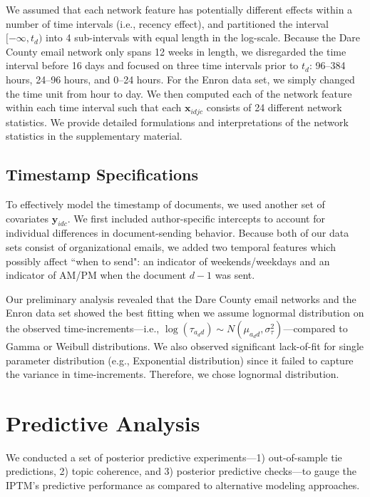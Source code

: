 \documentclass{article}
\begin{document}
We assumed that each network feature has potentially different effects within a number of time intervals (i.e., recency effect), and partitioned the interval $[-\infty, t_d)$ into 4 sub-intervals with equal length in the log-scale. Because the Dare County email network only spans 12 weeks in length, we disregarded the time interval before 16 days and focused on three time intervals prior to $t_d$: 96--384 hours, 24--96 hours, and 0--24 hours. For the Enron data set, we simply changed the time unit from hour to day. We then computed each of the network feature within each time interval such that each $\boldsymbol{x}_{idjc}$ consists of 24 different network statistics. We provide detailed formulations and interpretations of the network statistics in the supplementary material.

\subsection{Timestamp Specifications}\label{subsec:Timestamp Specifications}
To effectively model the timestamp of documents, we used another set of covariates $\boldsymbol{y}_{idc}$. We first included author-specific intercepts to account for individual differences in document-sending behavior. Because both of our data sets consist of organizational emails, we added two temporal features which possibly affect ``when to send": an indicator of weekends/weekdays and an indicator of AM/PM when the document $d-1$ was sent. 

Our preliminary analysis revealed that the Dare County email networks and the Enron data set showed the best fitting when we assume lognormal distribution on the observed time-increments---i.e., $\log(\tau_{a_dd}) \sim N(\mu_{a_d d}, \sigma^2_\tau)$---compared to Gamma or Weibull distributions. We also observed significant lack-of-fit for single parameter distribution (e.g., Exponential distribution) since it failed to capture the variance in time-increments. Therefore, we chose lognormal distribution. 

\section{Predictive Analysis}\label{sec:Experiments}
We conducted a set of posterior predictive experiments---1) out-of-sample tie predictions, 2) topic coherence, and 3) posterior predictive checks---to gauge the IPTM's predictive performance as compared to alternative modeling approaches.
\end{document}
